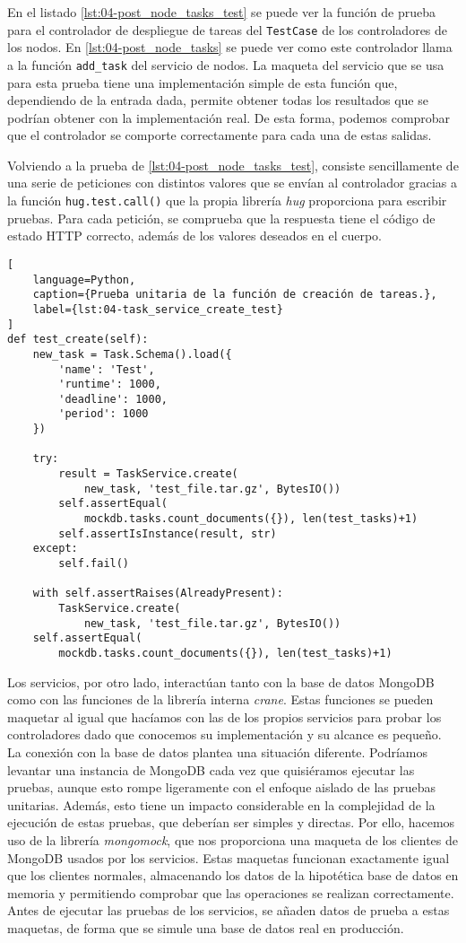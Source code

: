 En el listado \ref{lst:04-post_node_tasks_test} se puede ver la función de
prueba para el controlador de despliegue de tareas del \texttt{TestCase} de los
controladores de los nodos. En \ref{lst:04-post_node_tasks} se puede ver como
este controlador llama a la función \texttt{add\_task} del servicio de nodos. La
maqueta del servicio que se usa para esta prueba tiene una implementación simple
de esta función que, dependiendo de la entrada dada, permite obtener todas los
resultados que se podrían obtener con la implementación real. De esta forma,
podemos comprobar que el controlador se comporte correctamente para cada una de
estas salidas.

Volviendo a la prueba de \ref{lst:04-post_node_tasks_test}, consiste
sencillamente de una serie de peticiones con distintos valores que se envían al
controlador gracias a la función \texttt{hug.test.call()} que la propia librería
\textit{hug} proporciona para escribir pruebas. Para cada petición, se comprueba
que la respuesta tiene el código de estado HTTP correcto, además de los valores
deseados en el cuerpo.

\begin{lstlisting}[
    language=Python,
    caption={Prueba unitaria de la función de creación de tareas.},
    label={lst:04-task_service_create_test}
]
def test_create(self):
    new_task = Task.Schema().load({
        'name': 'Test',
        'runtime': 1000,
        'deadline': 1000,
        'period': 1000
    })

    try:
        result = TaskService.create(
            new_task, 'test_file.tar.gz', BytesIO())
        self.assertEqual(
            mockdb.tasks.count_documents({}), len(test_tasks)+1)
        self.assertIsInstance(result, str)
    except:
        self.fail()

    with self.assertRaises(AlreadyPresent):
        TaskService.create(
            new_task, 'test_file.tar.gz', BytesIO())
    self.assertEqual(
        mockdb.tasks.count_documents({}), len(test_tasks)+1)
\end{lstlisting}

Los servicios, por otro lado, interactúan tanto con la base de datos MongoDB
como con las funciones de la librería interna \textit{crane}. Estas funciones se
pueden maquetar al igual que hacíamos con las de los propios servicios para
probar los controladores dado que conocemos su implementación y su alcance es
pequeño. La conexión con la base de datos plantea una situación diferente.
Podríamos levantar una instancia de MongoDB cada vez que quisiéramos ejecutar
las pruebas, aunque esto rompe ligeramente con el enfoque aislado de las pruebas
unitarias. Además, esto tiene un impacto considerable en la complejidad de la
ejecución de estas pruebas, que deberían ser simples y directas. Por ello,
hacemos uso de la librería \textit{mongomock}, que nos proporciona una maqueta
de los clientes de MongoDB usados por los servicios. Estas maquetas funcionan
exactamente igual que los clientes normales, almacenando los datos de la
hipotética base de datos en memoria y permitiendo comprobar que las operaciones
se realizan correctamente. Antes de ejecutar las pruebas de los servicios, se
añaden datos de prueba a estas maquetas, de forma que se simule una base de
datos real en producción.

